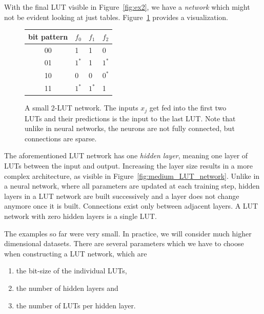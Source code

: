 \noindent With the final LUT visible in Figure~\ref{fig:ex2}, we have a \textit{network} which might not be evident looking at just tables. Figure~\ref{fig:first_LUT_network} provides a visualization.

\begin{figure}[!htb]
    \centering
  \begin{minipage}[b]{.4\linewidth}
    \begin{tabular}{clll}
    bit pattern & $f_0$ & $f_1$ & $f_2$ \\ \hline
    00          & 1      & 1      & 0     \\
    01          & $1^*$  & 1      & $1^*$ \\
    10          & 0      & 0      & $0^*$ \\
    11          & $1^*$  & $1^*$ & 1    
    \end{tabular}
    \vspace{1.5em}
  \end{minipage}
    
\caption{A small 2-LUT network. The inputs $x_j$ get fed into the first two LUTs and their predictions is the input to the last LUT. Note that unlike in neural networks, the neurons are not fully connected, but connections are sparse.}
\label{fig:first_LUT_network}
\end{figure}

\noindent The aforementioned LUT network has one \textit{hidden layer}, meaning one layer of LUTs between the input and output. Increasing the layer size results in a more complex architecture, as visible in Figure~\ref{fig:medium_LUT_network}. Unlike in a neural network, where all parameters are updated at each training step, hidden layers in a LUT network are built successively and a layer does not change anymore once it is built. Connections exist only between adjacent layers. A LUT network with zero hidden layers is a single LUT.

\noindent The examples so far were very small. In practice, we will consider much higher dimensional datasets. There are several parameters which we have to choose when constructing a LUT network, which are

\vspace{0.5em}
\begin{enumerate}
    \item the bit-size of the individual LUTs,
    \item the number of hidden layers and
    \item the number of LUTs per hidden layer.
\end{enumerate}
\vspace{0.5em}

